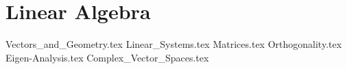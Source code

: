 \section{Linear Algebra}

{Vectors_and_Geometry.tex}
{Linear_Systems.tex}
{Matrices.tex}
{Orthogonality.tex}
{Eigen-Analysis.tex}
{Complex_Vector_Spaces.tex}